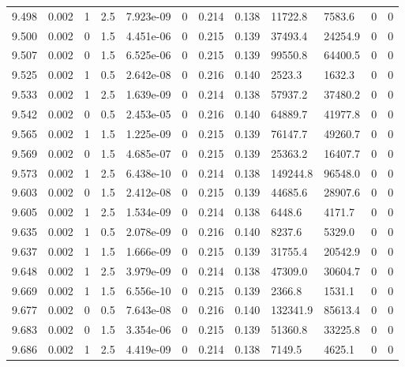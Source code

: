 \documentclass[preview]{standalone}
\begin{document}
{{{{{{{{{{{{{{{{{\begin{tabular}{L{1.2cm}C{1.2cm} C{0.3cm}C{0.5cm} C{1.4cm}C{1.4cm} C{1.4cm}C{1.4cm} C{1.6cm}C{1.6cm} C{1.6cm}C{1.6cm}}
  9.498  &  0.002  & 1     & 2.5 &  7.923e-09  & 0  &  0.214&   0.138& 11722.8 & 7583.6   &  0 & 0  \\ 
  9.500  &  0.002  & 0     & 1.5 &  4.451e-06  & 0  &  0.215&   0.139& 37493.4 & 24254.9   &  0 & 0  \\ 
  9.507  &  0.002  & 0     & 1.5 &  6.525e-06  & 0  &  0.215&   0.139& 99550.8 & 64400.5   &  0 & 0  \\ 
  9.525  &  0.002  & 1     & 0.5 &  2.642e-08  & 0  &  0.216&   0.140& 2523.3 & 1632.3   &  0 & 0  \\ 
  9.533  &  0.002  & 1     & 2.5 &  1.639e-09  & 0  &  0.214&   0.138& 57937.2 & 37480.2   &  0 & 0  \\ 
  9.542  &  0.002  & 0     & 0.5 &  2.453e-05  & 0  &  0.216&   0.140& 64889.7 & 41977.8   &  0 & 0  \\ 
  9.565  &  0.002  & 1     & 1.5 &  1.225e-09  & 0  &  0.215&   0.139& 76147.7 & 49260.7   &  0 & 0  \\ 
  9.569  &  0.002  & 0     & 1.5 &  4.685e-07  & 0  &  0.215&   0.139& 25363.2 & 16407.7   &  0 & 0  \\ 
  9.573  &  0.002  & 1     & 2.5 &  6.438e-10  & 0  &  0.214&   0.138& 149244.8 & 96548.0   &  0 & 0  \\ 
  9.603  &  0.002  & 0     & 1.5 &  2.412e-08  & 0  &  0.215&   0.139& 44685.6 & 28907.6   &  0 & 0  \\ 
  9.605  &  0.002  & 1     & 2.5 &  1.534e-09  & 0  &  0.214&   0.138& 6448.6 & 4171.7   &  0 & 0  \\ 
  9.635  &  0.002  & 1     & 0.5 &  2.078e-09  & 0  &  0.216&   0.140& 8237.6 & 5329.0   &  0 & 0  \\ 
  9.637  &  0.002  & 1     & 1.5 &  1.666e-09  & 0  &  0.215&   0.139& 31755.4 & 20542.9   &  0 & 0  \\ 
  9.648  &  0.002  & 1     & 2.5 &  3.979e-09  & 0  &  0.214&   0.138& 47309.0 & 30604.7   &  0 & 0  \\ 
  9.669  &  0.002  & 1     & 1.5 &  6.556e-10  & 0  &  0.215&   0.139& 2366.8 & 1531.1   &  0 & 0  \\ 
  9.677  &  0.002  & 0     & 0.5 &  7.643e-08  & 0  &  0.216&   0.140& 132341.9 & 85613.4   &  0 & 0  \\ 
  9.683  &  0.002  & 0     & 1.5 &  3.354e-06  & 0  &  0.215&   0.139& 51360.8 & 33225.8   &  0 & 0  \\ 
  9.686  &  0.002  & 1     & 2.5 &  4.419e-09  & 0  &  0.214&   0.138& 7149.5 & 4625.1   &  0 & 0  \\ 

\end{tabular}}}}}}}}}}}}}}}}}}
\end{document}
